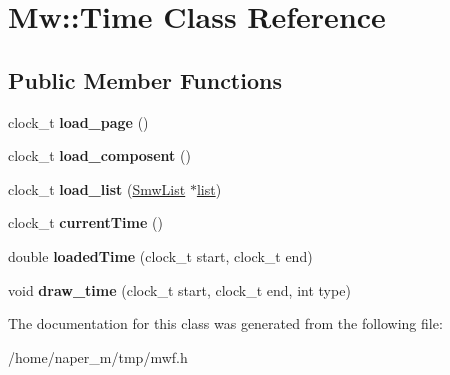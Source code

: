 \hypertarget{class_mw_1_1_time}{\section{Mw\-:\-:Time Class Reference}
\label{class_mw_1_1_time}
}
\subsection*{Public Member Functions}
\begin{DoxyCompactItemize}
\item 
\hypertarget{class_mw_1_1_time_a31237596e3b05133adcdd0ad62711a9e}{clock\-\_\-t {\bfseries load\-\_\-page} ()}\label{class_mw_1_1_time_a31237596e3b05133adcdd0ad62711a9e}

\item 
\hypertarget{class_mw_1_1_time_a8b828d42340f21daa7e887e288c7b8fe}{clock\-\_\-t {\bfseries load\-\_\-composent} ()}\label{class_mw_1_1_time_a8b828d42340f21daa7e887e288c7b8fe}

\item 
\hypertarget{class_mw_1_1_time_a5fb6877a0d53f0cf3437e818e6501b03}{clock\-\_\-t {\bfseries load\-\_\-list} (\hyperlink{struct_mw__list}{Smw\-List} $\ast$\hyperlink{structa__list}{list})}\label{class_mw_1_1_time_a5fb6877a0d53f0cf3437e818e6501b03}

\item 
\hypertarget{class_mw_1_1_time_a5a9894595f44aadf51fee4f639c149db}{clock\-\_\-t {\bfseries current\-Time} ()}\label{class_mw_1_1_time_a5a9894595f44aadf51fee4f639c149db}

\item 
\hypertarget{class_mw_1_1_time_a6df4943b53100110aa06b0638ae7746d}{double {\bfseries loaded\-Time} (clock\-\_\-t start, clock\-\_\-t end)}\label{class_mw_1_1_time_a6df4943b53100110aa06b0638ae7746d}

\item 
\hypertarget{class_mw_1_1_time_a7f2195740e82f59a720fa98988695864}{void {\bfseries draw\-\_\-time} (clock\-\_\-t start, clock\-\_\-t end, int type)}\label{class_mw_1_1_time_a7f2195740e82f59a720fa98988695864}

\end{DoxyCompactItemize}


The documentation for this class was generated from the following file\-:\begin{DoxyCompactItemize}
\item 
/home/naper\-\_\-m/tmp/mwf.\-h\end{DoxyCompactItemize}
